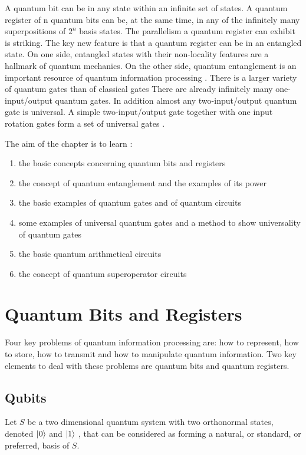 \documentclass[12pt]{book}
\begin{document}
A quantum bit can be in any state within an infinite set of 
states. A quantum register
of n quantum bits can be, at the same time,  in any of the 
infinitely many superpositions
of
$2^{n}$
basis states. The parallelism a quantum register can exhibit 
is striking.  The key new
feature is that a quantum register can be in an entangled 
state. On one side,  entangled
states with their non-locality features are a hallmark of 
quantum mechanics. On the other
side, quantum entanglement is an important resource of 
quantum information processing .
There is a larger variety of quantum gates than of classical 
gates  There are already
infinitely many one-input/output quantum gates. In addition  
almost any two-input/output
quantum gate is universal. A simple two-input/output gate 
together with one input rotation
gates form a set of universal gates .

The aim of the chapter is to learn :

\begin{enumerate}
	\item the basic concepts concerning quantum bits and registers
	\item the concept of quantum entanglement and the examples of its power
	\item the basic examples of quantum gates and of quantum circuits
	\item some examples of universal quantum gates and a method to show universality of quantum gates
	\item the basic quantum arithmetical circuits
	\item the concept of quantum superoperator circuits
\end{enumerate}


\section{Quantum Bits and Registers}

Four key problems of quantum information processing are: how to represent, how to store,
how to transmit and how to manipulate quantum information. Two key elements to deal with these problems are quantum bits and quantum registers.


\subsection{Qubits}

Let $S$ be a two dimensional quantum system with two orthonormal states, denoted $\ket{0}$ and $\ket{1}$ , that can be considered as forming a natural, or standard, or preferred, basis of $S$.
\end{document}
